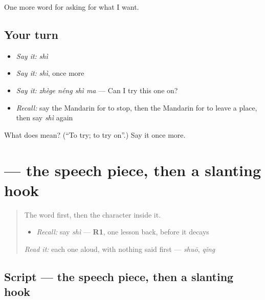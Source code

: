 \begin{grammarlens}[title={What you've built}]
One more word for asking for what I want.
\end{grammarlens}

\subsection*{Your turn}
\begin{itemize}
\raggedright
  \item \emph{Say it:} \emph{shì}
  \item \emph{Say it:} \emph{shì}, once more
  \item \emph{Say it:} \emph{zhège néng shì ma} — Can I try this one on?
  \item \emph{Recall:} say the Mandarin for to stop, then the Mandarin for to leave a place, then say \emph{shì} again
\end{itemize}

\begin{tcolorbox}[breakable,colback=teal!4,colframe=teal!35!black,title={Before you move on}]
What does  mean? (\textquotedblleft{}To try; to try on\textquotedblright{}.) Say it once more.
\end{tcolorbox}
\section[\texorpdfstring{\zh{试} (shì)}{试 (shì)}]{ — the speech piece, then a slanting hook}

\label{lesson:ZH-W108-shi-try}



\begin{quote}
The word first, then the character inside it.

\begin{itemize}
\raggedright
  \item \emph{Recall:} say \emph{shì} — \textbf{R1}, one lesson back, before it decays
\end{itemize}

\begin{quote}
 
\end{quote}

\emph{Read it:} each one aloud, with nothing said first — \emph{shuō}, \emph{qǐng}
\end{quote}

\subsection*{Script — the speech piece, then a slanting hook}

